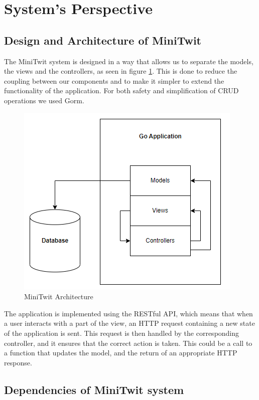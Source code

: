 \section{System's Perspective}

\subsection{Design and Architecture of MiniTwit}
The MiniTwit system is designed in a way that allows us to separate the models, the views and the controllers,
as seen in figure \ref{fig:minitwit}. This is done to reduce the coupling between our components and to make 
it simpler to extend the functionality of the application. For both safety and simplification of CRUD operations 
we used Gorm.

\begin{figure}[H]
    \centering
    \captionsetup{justification=centering,margin=1cm}
    \includegraphics[width=0.8\linewidth]{report/images/system_architecture.png}
    \caption{MiniTwit Architecture}
    \label{fig:minitwit}
\end{figure}

The application is implemented using the RESTful API, which means that when a user interacts with a part of the 
view, an HTTP request containing a new state of the application is sent. This request is then handled by the corresponding controller, and it ensures 
that the correct action is taken. This could be a call to a function that updates the model, and the return of 
an appropriate HTTP response. 


\subsection{Dependencies of MiniTwit system}

